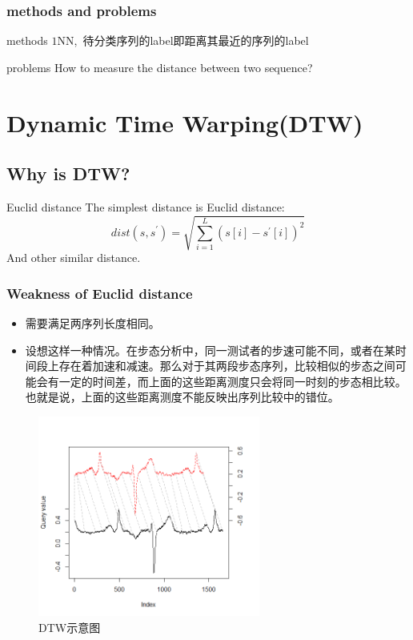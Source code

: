 \documentclass[xetex,mathserif,serif]{beamer}
\begin{document}
\begin{frame}
\frametitle{methods and problems}
\begin{block}{methods}
$1$NN,\ 待分类序列的label即距离其最近的序列的label
\end{block}
\hspace{15em}
\begin{block}{problems}
How to measure the distance between two sequence?
\end{block}
\end{frame}

\section{Dynamic Time Warping(DTW)}
\subsection{Why is DTW?}
\begin{frame}
\begin{block}{Euclid distance}
The simplest distance is Euclid distance:
\[dist\left( {s,{s^{'}}} \right) = \sqrt {\sum\limits_{i = 1}^L {{{\left( {s\left[ i \right] - {s^{'}}\left[ i \right]} \right)}^2}} } \]
And other similar distance.
\end{block}
\end{frame}

\begin{frame}
\frametitle{Weakness of Euclid distance}
\begin{spacing}{1.5}
\begin{itemize}
  \item 需要满足两序列长度相同。
  \item 设想这样一种情况。在步态分析中，同一测试者的步速可能不同，或者在某时间段上存在着加速和减速。那么对于其两段步态序列，比较相似的步态之间可能会有一定的时间差，而上面的这些距离测度只会将同一时刻的步态相比较。也就是说，上面的这些距离测度不能反映出序列比较中的错位。
\end{itemize}
\end{spacing}
\end{frame}

\begin{frame}
\begin{figure}
  \centering
  \includegraphics[width=0.65\textwidth]{two_way_plot.png}
  \caption{DTW示意图}\label{fig：1}
\end{figure}
\end{frame}
\end{document}
